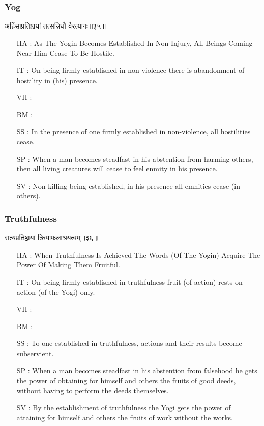\begin{frame}[fragile]\frametitle{Yog}
\begin{sanskrit}
अहिंसाप्रतिष्ठायां तत्सन्निधौ वैरत्यागः॥३५॥
\end{sanskrit}

	\begin{itemize}
	\item [HA]: As The Yogin Becomes Established In Non-Injury, All Beings Coming Near Him Cease To Be Hostile.
	\item [IT]: On being firmly established in non-violence there is abandonment of hostility in (his) presence.
	\item [VH]: 
	\item [BM]: 
	\item [SS]: In the presence of one firmly established in non-violence, all hostilities cease.
	\item [SP]: When a man becomes steadfast in his abstention from harming others, then all living creatures will cease to feel enmity in his presence.
	\item [SV]: Non-killing being established, in his presence all emnities cease (in others). 
	\end{itemize}
\end{frame}


\begin{frame}[fragile]\frametitle{Truthfulness}
\begin{sanskrit}
सत्यप्रतिष्ठायां क्रियाफलाश्रयत्वम्॥३६॥
\end{sanskrit}

	\begin{itemize}
	\item [HA]: When Truthfulness Is Achieved The Words (Of The Yogin) Acquire The Power Of Making Them Fruitful.
	\item [IT]: On being firmly established in truthfulness fruit (of action) rests on action (of the Yogi) only.
	\item [VH]: 
	\item [BM]: 
	\item [SS]: To one established in truthfulness, actions and their results become subservient.
	\item [SP]: When a man becomes steadfast in his abstention from falsehood he gets the power of obtaining for himself and others the fruits of good deeds, without having to perform the deeds themselves.
	\item [SV]: By the establishment of truthfulness the Yogi gets the power of attaining for himself and others the fruits of work without the works. 
	\end{itemize}
\end{frame}



